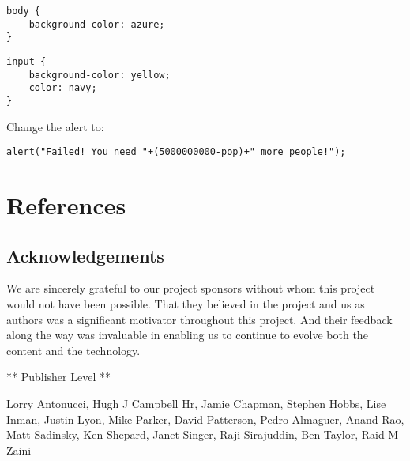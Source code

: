 \documentclass[]{memoir}
\begin{document}

\begin{lstlisting}
body {
    background-color: azure;
}
\end{lstlisting}


\begin{lstlisting}
input {
    background-color: yellow;
    color: navy;
}
\end{lstlisting}


Change the alert to:

\begin{lstlisting}
alert("Failed! You need "+(5000000000-pop)+" more people!");
\end{lstlisting}

\chapter{References}

\section{Acknowledgements}

We are sincerely grateful to our project sponsors without whom this
project would not have been possible. That they believed in the project
and us as authors was a significant motivator throughout this project.
And their feedback along the way was invaluable in enabling us to
continue to evolve both the content and the technology.

** Publisher Level **

Lorry Antonucci, Hugh J Campbell Hr, Jamie Chapman, Stephen Hobbs, Lise
Inman, Justin Lyon, Mike Parker, David Patterson, Pedro Almaguer, Anand
Rao, Matt Sadinsky, Ken Shepard, Janet Singer, Raji Sirajuddin, Ben
Taylor, Raid M Zaini
\end{document}
